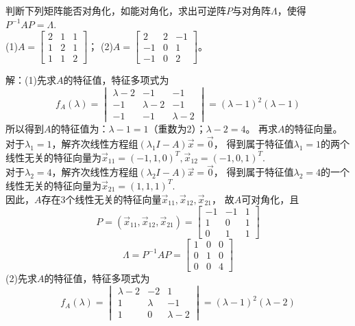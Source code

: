 \begin{eg}
判断下列矩阵能否对角化，如能对角化，求出可逆阵$P$与对角阵$\Lambda$，使得
$P^{-1}AP=\Lambda$.\\
(1)$A=\begin{bmatrix}2&1&1\\1&2&1\\1&1&2\end{bmatrix}$；
(2)$A=\begin{bmatrix}2&2&-1\\-1&0&1\\-1&0&2\end{bmatrix}$。
\end{eg}
解：(1)先求$A$的特征值，特征多项式为
\begin{equation*}
f_A(\lambda)=
\begin{vmatrix}\lambda-2&-1&-1\\-1&\lambda-2&-1\\-1&-1&\lambda-2\end{vmatrix}
=(\lambda-1)^2(\lambda-1)
\end{equation*}
所以得到$A$的特征值为：$\lambda-1=1$（重数为2）；$\lambda-2=4$。
再求$A$的特征向量。\\
对于$\lambda_1=1$，解齐次线性方程组$(\lambda_1 I-A)\vec{x}=\vec{0}$，
得到属于特征值$\lambda_1=1$的两个线性无关的特征向量为$\vec{x}_{11}=(-1,1,0)^T,\vec{x}_{12}=(-1,0,1)^T$.\\
对于$\lambda_2=4$，解齐次线性方程组$(\lambda_2 I-A)\vec{x}=\vec{0}$，
得到属于特征值$\lambda_2=4$的一个线性无关的特征向量为$\vec{x}_{21}=(1,1,1)^T$.\\
因此，$A$存在3个线性无关的特征向量$\vec{x}_{11},\vec{x}_{12},\vec{x}_{21}$，
故$A$可对角化，且
\begin{equation*}
P=(\vec{x}_{11},\vec{x}_{12},\vec{x}_{21})=\begin{bmatrix}-1&-1&1\\1&0&1\\0&1&1
\end{bmatrix}
\end{equation*}
\begin{equation*}
\Lambda=P^{-1}AP=\begin{bmatrix}1&0&0\\0&1&0\\0&0&4\end{bmatrix}
\end{equation*}
(2)先求$A$的特征值，特征多项式为
\begin{equation*}
f_A(\lambda)=
\begin{vmatrix}\lambda-2&-2&1\\1&\lambda&-1\\1&0&\lambda-2\end{vmatrix}
=(\lambda-1)^2(\lambda-2)
\end{equation*}
